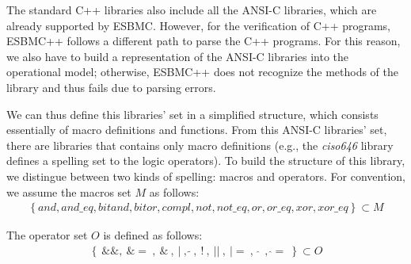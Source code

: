 \documentclass[a4paper]{llncs}
\begin{document}
The standard C++ libraries also include all the ANSI-C libraries, which
are already supported by ESBMC.  However, for the verification of C++
programs, ESBMC++ follows a different path to parse the C++ programs.
For this reason, we also have to build a representation of the ANSI-C
libraries into the operational model; otherwise, ESBMC++ does not recognize
the methods of the library and thus fails due to parsing errors.

We can thus
define this libraries' set in a simplified structure, which consists
essentially of macro definitions and functions. From this ANSI-C libraries' set,
there are libraries that contains only macro definitions (e.g., the \textit{ciso646} library
defines a spelling set to the logic operators). To build the structure of this
library, we distingue between two kinds of spelling: macros and operators.
For convention, we assume the macros set $M$ as follows:
%
\begin{eqnarray}
\label{ciso646-macro-set}
\left\{and, and\_eq, bitand, bitor, compl, not, not\_eq, or, or\_eq, xor, xor\_eq\right\} \subset M
\end{eqnarray}

The operator set $O$ is defined as follows:
%
\begin{eqnarray}
\label{ciso646-operator-set}
\left\{
\: \&\&,
\: \&= \:,
\: \& \:,
\: | \:,
\: \widetilde{} \:,
\: ! \:,
\: || \:,
\: |= \:,
\:\: \widehat{} \:\:,
\: \widehat{}= \:
\right\} \subset O
\end{eqnarray}
\end{document}
